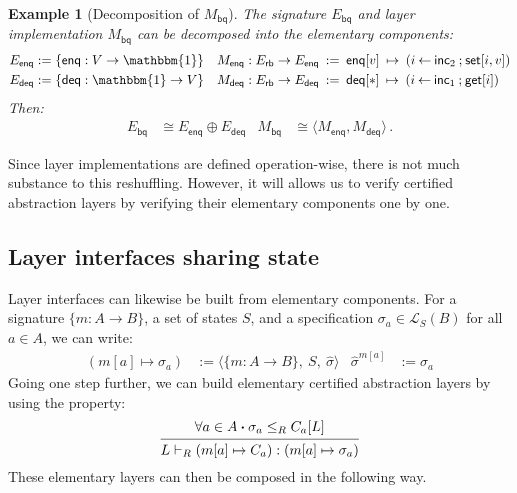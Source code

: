 \documentclass[11pt,oneside]{book}
\newtheorem{example}[theorem]{Example}
\theoremstyle{definition}
\newcommand{\kw}[1]{\ensuremath{ \mathsf{#1} }}
\newcommand{\bdot}{\boldsymbol{\cdot}}
\begin{document}

\begin{example}[Decomposition of $M_\kw{bq}$]
The signature $E_\kw{bq}$ and layer implementation $M_\kw{bq}$
can be decomposed into the elementary components:
\begin{align*}
  E_\kw{enq} &:= \{ \kw{enq} : V \rightarrow \mathbbm{1} \} &
  M_\kw{enq} : E_\kw{rb} \rightarrow E_\kw{enq} \: &:= \:
    \kw{enq}[v] \: \mapsto \:
     (i \mathbin{\leftarrow} \kw{inc}_2 \mathbin{;}
      \kw{set}[i, v]) \\
  E_\kw{deq} &:= \{ \kw{deq} : \mathbbm{1} \rightarrow V \} &
  M_\kw{deq} : E_\kw{rb} \rightarrow E_\kw{deq} \: &:= \:
    \kw{deq}[*] \:\mapsto\:
     (i \mathbin{\leftarrow} \kw{inc}_1 \mathbin{;}
      \kw{get}[i])
\end{align*}
Then:
\begin{align*}
  E_\kw{bq} &\cong E_\kw{enq} \oplus E_\kw{deq} &
  M_\kw{bq} &\cong \langle M_\kw{enq}, M_\kw{deq} \rangle \,.
\end{align*}
\end{example}

Since layer implementations are defined operation-wise,
there is not much substance to this reshuffling.
However,
it will allows us to verify certified abstraction layers
by verifying their elementary components one by one.


\subsection{Layer interfaces sharing state} \label{sec:layerprod} %

Layer interfaces can likewise be built from elementary components.
For a signature $\{ m : A \rightarrow B \}$,
a set of states $S$,
and a specification $\sigma_a \in \mathcal{L}_S(B)$ for all $a \in A$,
we can write:
\begin{align*}
  (m[a] \mapsto \sigma_a) &:=
  \langle
    \{ m : A \rightarrow B \}, \:
    S, \:
    \hat{\sigma}
  \rangle
  &
  \hat{\sigma}^{m[a]} &:= \sigma_a
\end{align*}
Going one step further,
we can build elementary certified abstraction layers
by using the property:
\[
  \begin{prooftree}
    \hypo{\forall a \in A \bdot \sigma_a \le_R C_a[L]}
    \infer1{L \vdash_R (m[a] \mapsto C_a) : (m[a] \mapsto \sigma_a)}
  \end{prooftree}
\]
These elementary layers
can then be composed in the following way.
\end{document}
